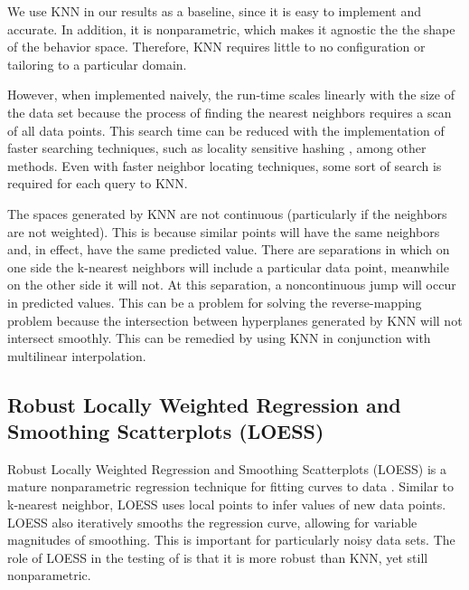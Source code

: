 We use KNN in our results as a baseline, since it is easy to implement and accurate.
In addition, it is nonparametric, which makes it agnostic the the shape of the behavior space.
Therefore, KNN requires little to no configuration or tailoring to a particular domain.

However, when implemented naively, the run-time scales linearly with the size of the data set because the process of finding the nearest neighbors requires a scan of all data points.
This search time can be reduced with the implementation of faster searching techniques, such as locality sensitive hashing \cite{gionis1999similarity}, among other methods.
Even with faster neighbor locating techniques, some sort of search is required for each query to KNN.

The spaces generated by KNN are not continuous (particularly if the neighbors are not weighted).
This is because similar points will have the same neighbors and, in effect, have the same predicted value.
There are separations in which on one side the k-nearest neighbors will include a particular data point, meanwhile on the other side it will not.
At this separation, a noncontinuous jump will occur in predicted values.
This can be a problem for solving the reverse-mapping problem because the intersection between hyperplanes generated by KNN will not intersect smoothly.
This can be remedied by using KNN in conjunction with multilinear interpolation.
      
\subsection{Robust Locally Weighted Regression and Smoothing Scatterplots (LOESS)}


Robust Locally Weighted Regression and Smoothing Scatterplots (LOESS) is a mature nonparametric regression technique for fitting curves to data   \cite{cleveland1979robust}\cite{cleveland1988locally}.
Similar to k-nearest neighbor, LOESS uses local points to infer values of new data points.
LOESS also iteratively smooths the regression curve, allowing for variable magnitudes of smoothing.
This is important for particularly noisy data sets.
The role of LOESS in the testing of \fw is that it is more robust than KNN, yet still nonparametric.

